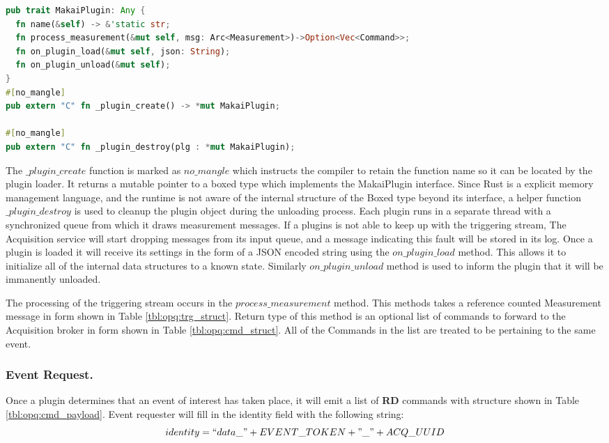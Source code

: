 \begin{lstlisting}[language=Rust, style=colouredRust]
pub trait MakaiPlugin: Any {
  fn name(&self) -> &'static str;
  fn process_measurement(&mut self, msg: Arc<Measurement>)->Option<Vec<Command>>;
  fn on_plugin_load(&mut self, json: String);
  fn on_plugin_unload(&mut self);
}
#[no_mangle]
pub extern "C" fn _plugin_create() -> *mut MakaiPlugin;

#[no_mangle]
pub extern "C" fn _plugin_destroy(plg : *mut MakaiPlugin);
\end{lstlisting}

The $\_plugin\_create$ function is marked as $no\_mangle$ which instructs the compiler to retain the function name so it can be located by the plugin loader.
It returns a mutable pointer to a boxed type which implements the MakaiPlugin interface.
Since Rust is a explicit memory management language, and the runtime is not aware of the internal structure of the Boxed type beyond its interface,
a helper function $\_plugin\_destroy$ is used to cleanup the plugin object during the unloading process.
Each plugin runs in a separate thread with a synchronized queue from which it draws measurement messages.
If a plugins is not able to keep up with the triggering stream, The Acquisition service will start dropping messages from its input queue,
and a message indicating this fault will be stored in its log.
Once a plugin is loaded it will receive its settings in the form of a JSON encoded string using the $on\_plugin\_load$ method.
This allows it to initialize all of the internal data structures to a known state.
Similarly $on\_plugin\_unload$ method is used to inform the plugin that it will be immanently unloaded.

The processing of the triggering stream occurs in the $process\_measurement$ method.
This methods takes a reference counted Measurement message in form shown in Table \ref{tbl:opq:trg_struct}.
Return type of this method is an optional list of commands to forward to the Acquisition broker in form shown in Table \ref{tbl:opq:cmd_struct}.
All of the Commands in the list are treated to be pertaining to the same event.

\subsubsection{Event Request.}
Once a plugin determines that an event of interest has taken place, it will emit a list of \textbf{RD} commands with structure shown in Table \ref{tbl:opq:cmd_payload}.
Event requester will fill in the identity field with the following string:
\[ identity = ``data\_" + EVENT\_TOKEN +"\_" + ACQ\_UUID\]

